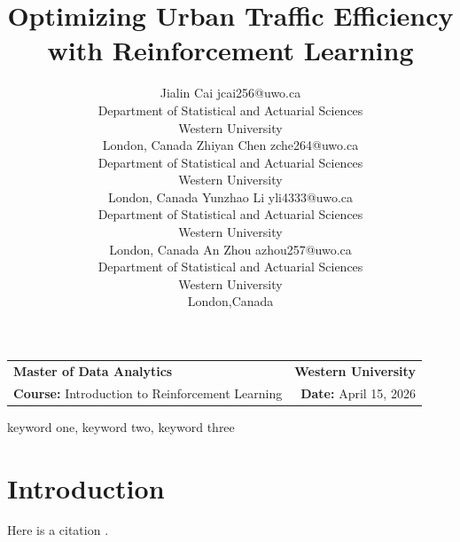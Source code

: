 \documentclass[twoside,11pt]{article}
\makeatletter
\newcommand{\reportheading}{
    \noindent
    \begin{tabular*}{\textwidth}{l @{\extracolsep{\fill}} r}
        \textbf{Master of Data Analytics} & \textbf{Western University} \\
        \textbf{Course:} Introduction to Reinforcement Learning & \textbf{Date:} April 15, 2026 \\
        \hline
    \end{tabular*}
    \vspace{0.5cm}
}
\makeatother
\begin{document}
\reportheading
\title{Optimizing Urban Traffic Efficiency with Reinforcement Learning}

\author{
\name Jialin Cai \email jcai256@uwo.ca \\
\addr Department of Statistical and Actuarial Sciences \\
Western University \\
London, Canada
\AND
\name Zhiyan Chen \email zche264@uwo.ca \\
\addr Department of Statistical and Actuarial Sciences \\
Western University \\
London, Canada
\AND
\name Yunzhao Li \email yli4333@uwo.ca \\
\addr Department of Statistical and Actuarial Sciences \\
Western University \\
London, Canada
\AND
\name An Zhou \email azhou257@uwo.ca \\
\addr Department of Statistical and Actuarial Sciences \\
Western University \\
London,Canada
}

\editor{}

\maketitle

\begin{abstract}%
\blindtext
\end{abstract}

\begin{keywords}
  keyword one, keyword two, keyword three
\end{keywords}

\section{Introduction}

\blindmathpaper

Here is a citation \cite{chow:68}.


\end{document}
